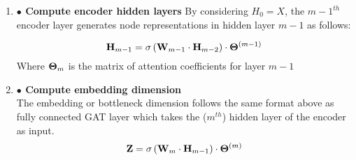 \documentclass[a4paper,12pt]{article}
\begin{document}
\begin{itemize}
\begin{enumerate}
{\begin{enumerate}
{					\[ \theta_{ij} = \frac{\sigma\left(\exp\left({\bf a}_s^T\phi\left[{\bf W}h_i\right]+{\bf a}_v^T\phi\left[{\bf W}h_j \right]\right)\right)}
					{\sum_{k\in \mathcal{N}(i)}\sigma\left(\exp\left({\bf a}_s^T\phi\left[{\bf W}h_i\right]+{\bf a}_v^T\phi\left[{\bf W}h_k \right]\right)\right)} \]
					The weight parameters ${\bf a}_s^T$ aim to capture additional semantic information in node $i$ while the weight parameter ${\bf a}_v^T$ captures semantic information in node $j$. Furthermore, the Softmax function is used to normalize the attention coefficients so that the coefficients in the neighborhood of node $i$ sum to 1. \\
					\\
					In linear form, the [matrix of] attention coefficients for the $m$ layer of the model ${\bf \Theta}^{(m)}$ are computed as 
					\[{\bf \Theta}^{(m)} = \text{Softmax}\left(\sigma\left({\bf M}_s^{m} + {\bf M}_v^{m}\right)\right) \]
					\[{\bf M}_s^{m} = {\bf A}\odot \left[{\bf a}_s^{(m)^T} \cdot \phi\left({\bf W}_{m}{\bf H}_{m-1}\right)\right]\]
					\[{\bf M}_v^{m} = {\bf A}\odot \left[{\bf a}_v^{(m)^T}\cdot \phi\left( {\bf W}_{m}{\bf H}_{m-1}\right)\right]^T\]
					
					where
					\[ {\bf \Theta}_{ij}^{(m)} = \begin{cases} \theta_{ij}^{(m)} & \text{if there is and edge between node $i$ and node $j$} \\ 0 & \text{else}\end{cases} \]
					
					Note that in the above equations $\sigma$ is the sigmoid logistic function, $\odot$ denotes the element-wise product operation between matrices, and $\phi$ denotes the layer activation function. In the original formulation of GAT by \cite{velivckovic2017graph}, $\phi$ was the identity function, and LeakyReLU was used in place of the sigmoid funciton.}\\
					
				\item[]{\textbf{$\bullet$ Compute encoder hidden layers}
					By considering $H_0 = X$, the $m-1^{th}$ encoder layer generates node
					representations in hidden layer $m-1$ as follows:
					
					\[ {\bf H}_{m-1} = \sigma\left({\bf W}_{m-1}\cdot {\bf H}_{m-2}\right)\cdot {\bf \Theta}^{(m-1)}\] 
					Where ${\bf \Theta}_{m}$ is the matrix of attention coefficients for layer $m-1$\\
					}
				\newpage
				\item[]{\textbf{$\bullet$ Compute embedding dimension} \\
					The embedding or bottleneck dimension follows the same format above as fully connected GAT layer which takes the ($m^{th}$) hidden layer of the encoder as input.
					\[ {\bf Z} = \sigma\left({\bf W}_m\cdot {\bf H}_{m-1}\right)\cdot {\bf \Theta}^{(m)}\]
					
}
\end{enumerate}}
\end{enumerate}
\end{itemize}
\end{document}
